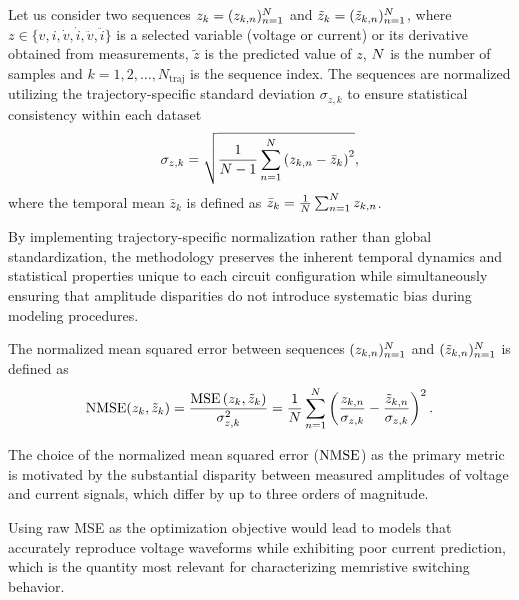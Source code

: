 \documentclass{ieeeaccess}
\begin{document}
Let us consider two sequences \(z_k=(z_{k,n})_{n=1}^{N}\) and \(\tilde{z}_k=(\tilde{z}_{k,n})_{n=1}^{N}\), where \(z \in \{v,i,\dot{v},\dot{i},\ddot{v},\ddot{i}\}\) is a selected variable (voltage or current) or its derivative obtained from measurements, \(\tilde{z}\) is the predicted value of \(z\), \(N\) is the number of samples and \(k = 1,2,\ldots, N_{\text{traj}}\) is the sequence index.
The sequences are normalized utilizing the trajectory-specific standard deviation \(\sigma_{z,k}\) to ensure statistical consistency within each dataset
\begin{equation}
  \sigma_{z,k} = \sqrt{\frac{1}{N-1} \sum_{n=1}^{N} \left(z_{k,n} - \bar{z}_k\right)^2},
\end{equation}
where the temporal mean \(\bar{z}_k\) is defined as \(\bar{z}_k = \frac{1}{N} \sum_{n=1}^{N} z_{k,n}\).

By implementing trajectory-specific normalization rather than global standardization, the methodology preserves the inherent temporal dynamics and statistical properties unique to each circuit configuration while simultaneously ensuring that amplitude disparities do not introduce systematic bias during modeling procedures.

The normalized mean squared error between sequences \(({z}_{k,n})_{n=1}^{N}\) and \((\tilde{z}_{k,n})_{n=1}^{N}\) is defined as
\begin{align*}
\operatorname{NMSE}(z_k,\tilde{z}_k)=\frac{\operatorname{MSE}\left(z_k,\tilde{z}_k\right)}{\sigma_{z,k}^2}=\frac{1}{N}\sum_{n=1}^{N}\left(\frac{{z}_{k,n}}{\sigma_{z,k}}-\frac{\tilde{z}_{k,n}}{\sigma_{z,k}}\right)^2.
\end{align*}

The choice of the normalized mean squared error (\(\operatorname{NMSE}\)) as the primary metric is motivated by the substantial disparity between measured amplitudes of voltage and current signals, which differ by up to three orders of magnitude.


Using raw MSE as the optimization objective would lead to models that accurately reproduce voltage waveforms while exhibiting poor current prediction, which is the quantity most relevant for characterizing memristive switching behavior.
\end{document}
